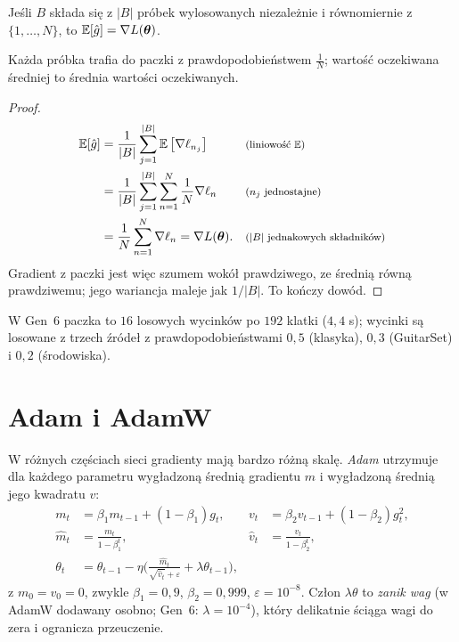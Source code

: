 \begin{twierdzenie}\label{tw:sgd}
Jeśli $B$ składa się z $|B|$ próbek wylosowanych niezależnie i równomiernie z $\{1,\dots,N\}$, to $\operatorname{\mathbb{E}}[\hat g]=\nabla L(\bm{\theta})$.
\end{twierdzenie}
\begin{pomyslDowodu}
Każda próbka trafia do paczki z prawdopodobieństwem $\frac1N$; wartość oczekiwana średniej to średnia wartości oczekiwanych.
\end{pomyslDowodu}
\begin{proof}
\begin{align*}
\operatorname{\mathbb{E}}[\hat g] &= \frac1{|B|}\sum_{j=1}^{|B|}\operatorname{\mathbb{E}}\big[\nabla\ell_{n_j}\big] && \text{\footnotesize (liniowość $\operatorname{\mathbb{E}}$)}\\
 &= \frac1{|B|}\sum_{j=1}^{|B|}\sum_{n=1}^{N}\frac1N\nabla\ell_n && \text{\footnotesize ($n_j$ jednostajne)}\\
 &= \frac1N\sum_{n=1}^N\nabla\ell_n=\nabla L(\bm{\theta}). && \text{\footnotesize ($|B|$ jednakowych składników)}
\end{align*}
Gradient z paczki jest więc szumem wokół prawdziwego, ze średnią równą prawdziwemu; jego wariancja maleje jak $1/|B|$. To kończy dowód.
\end{proof}

W Gen~6 paczka to $16$ losowych wycinków po $192$ klatki ($4{,}4$ s); wycinki są losowane z trzech źródeł z prawdopodobieństwami $0{,}5$ (klasyka), $0{,}3$ (GuitarSet) i $0{,}2$ (środowiska).

\section{Adam i AdamW}

W różnych częściach sieci gradienty mają bardzo różną skalę. \emph{Adam} utrzymuje dla każdego parametru wygładzoną średnią gradientu $m$ i wygładzoną średnią jego kwadratu $v$:
\begin{align*}
m_t &= \beta_1m_{t-1}+(1-\beta_1)g_t, & v_t &= \beta_2v_{t-1}+(1-\beta_2)g_t^2,\\
\hat m_t &= \frac{m_t}{1-\beta_1^t}, & \hat v_t &= \frac{v_t}{1-\beta_2^t},\\
\theta_t &= \theta_{t-1}-\eta\Big(\frac{\hat m_t}{\sqrt{\hat v_t}+\varepsilon}+\lambda\theta_{t-1}\Big),
\end{align*}
z $m_0=v_0=0$, zwykle $\beta_1=0{,}9$, $\beta_2=0{,}999$, $\varepsilon=10^{-8}$. Człon $\lambda\theta$ to \emph{zanik wag} (w AdamW dodawany osobno; Gen~6: $\lambda=10^{-4}$), który delikatnie ściąga wagi do zera i ogranicza przeuczenie.


